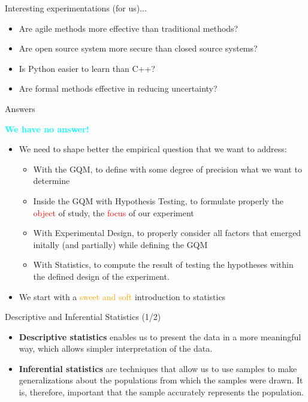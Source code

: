 \documentclass{beamer}
\begin{document}
\begin{frame}
{\centerline{Interesting experimentations (for us)...}}

\begin{itemize}
\item Are agile methods more effective than traditional methods?
\item Are open source system more secure than closed source systems?
\item Is Python easier to learn than C++?
\item Are formal methods effective in reducing uncertainty?
\end{itemize}

\end{frame}

\begin{frame}
{\centerline{Answers}}

\begin{center}
\Large
\textcolor{cyan}{\bf We have no answer!}
\end{center}
\vspace*{1cm}
\begin{itemize}
\item We need to shape better the empirical question that we want to address:
\begin{itemize}
\item With the GQM, to define with some degree of precision what we want to determine
\item Inside the GQM with Hypothesis Testing, to formulate properly the \textcolor{red}{object} of study, the \textcolor{red}{focus}  of our experiment
\item With Experimental Design, to properly consider all factors that emerged initally (and partially) while defining the GQM
\item With Statistics, to compute the result of testing the hypotheses within the defined design of the experiment.
\end{itemize}

\item We start with a \textcolor{orange}{sweet and soft} introduction to statistics
\end{itemize}

\end{frame}



\begin{frame}
{\centerline{Descriptive and Inferential Statistics (1/2)}}

\begin{itemize}
\item  \textbf{Descriptive statistics} enables us to present the data in a more meaningful way, which allows simpler interpretation of the data.
\item \textbf{Inferential statistics} are techniques that allow us to use samples to make generalizations about the populations from which the samples were drawn. It is, therefore, important that the sample accurately represents the population.
\end{itemize}


\end{frame}
\end{document}
